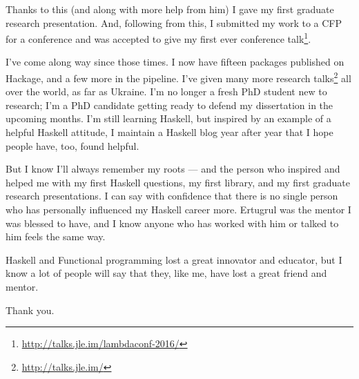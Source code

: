 \documentclass[]{article}
\renewcommand{\href}[2]{#2\footnote{\url{#1}}}
\begin{document}
Thanks to this (and along with more help from him) I gave my first graduate
research presentation. And, following from this, I submitted my work to a CFP
for a conference and was \href{http://talks.jle.im/lambdaconf-2016/}{accepted to
give my first ever conference talk}.

I've come along way since those times. I now have fifteen packages published on
Hackage, and a few more in the pipeline. I've given
\href{http://talks.jle.im/}{many more research talks} all over the world, as far
as Ukraine. I'm no longer a fresh PhD student new to research; I'm a PhD
candidate getting ready to defend my dissertation in the upcoming months. I'm
still learning Haskell, but inspired by an example of a helpful Haskell
attitude, I maintain a Haskell blog year after year that I hope people have,
too, found helpful.

But I know I'll always remember my roots --- and the person who inspired and
helped me with my first Haskell questions, my first library, and my first
graduate research presentations. I can say with confidence that there is no
single person who has personally influenced my Haskell career more. Ertugrul was
the mentor I was blessed to have, and I know anyone who has worked with him or
talked to him feels the same way.

Haskell and Functional programming lost a great innovator and educator, but I
know a lot of people will say that they, like me, have lost a great friend and
mentor.

Thank you.
\end{document}
